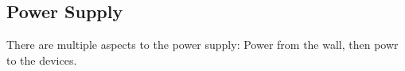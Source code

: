 \subsection{Power Supply}
There are multiple aspects to the power supply: Power from the wall, then powr to the devices.